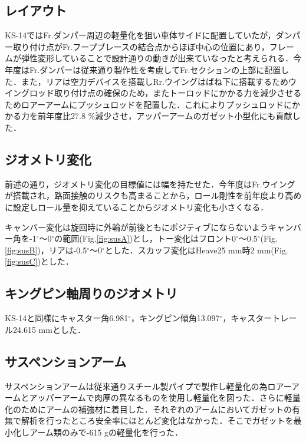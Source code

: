 \subsection{レイアウト}
KS-14ではFr.ダンパー周辺の軽量化を狙い車体サイドに配置していたが，ダンパー取り付け点がFr.フープブレースの結合点からほぼ中心の位置にあり，フレームが弾性変形していることで設計通りの動きが出来ていなったと考えられる．今年度はFr.ダンパーは従来通り製作性を考慮してFr.セクションの上部に配置した．また，リアは空力デバイスを搭載しRr.ウイングはばね下に搭載するためウイングロッド取り付け点の確保のため，またトーロッドにかかる力を減少させるためロアーアームにプッシュロッドを配置した．これによりプッシュロッドにかかる力を前年度比27.8 \%減少させ，アッパーアームのガゼット小型化にも貢献した．

\subsection{ジオメトリ変化}
前述の通り，ジオメトリ変化の目標値には幅を持たせた．今年度はFr.ウイングが搭載され，路面接触のリスクも高まることから，ロール剛性を前年度より高めに設定しロール量を抑えていることからジオメトリ変化も小さくなる．

キャンバー変化は旋回時に外輪が前後ともにポジティブにならないようキャンバー角を-1$^\circ$〜0$^\circ$の範囲(Fig.\ref{fig:susA})とし，トー変化はフロント0$^\circ$〜0.5$^\circ$(Fig.\ref{fig:susB})，リアは-0.5$^\circ$〜0$^\circ$とした．スカッフ変化はHeave25 mm時2 mm(Fig.\ref{fig:susC})とした．

\subsection{キングピン軸周りのジオメトリ}
KS-14と同様にキャスター角6.981$^\circ$，キングピン傾角13.097$^\circ$，キャスタートレール24.615 mmとした．

\subsection{サスペンションアーム}
サスペンションアームは従来通りスチール製パイプで製作し軽量化の為ロアーアームとアッパーアームで肉厚の異なるものを使用し軽量化を図った．さらに軽量化のためにアームの補強材に着目した．それぞれのアームにおいてガゼットの有無で解析を行ったところ安全率にほとんど変化はなかった．そこでガゼットを最小化しアーム類のみで-615 gの軽量化を行った．

